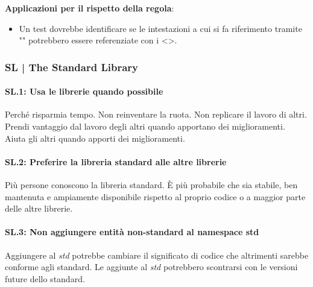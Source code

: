\textsf{\small \textbf{Applicazioni per il rispetto della regola}: }

\begin{itemize}
	\item \textsf{\small Un test dovrebbe identificare se le intestazioni a cui si fa riferimento tramite "" potrebbero essere referenziate con i <>.}
\end{itemize}



\newpage

\subsubsection{SL | The Standard Library}

\paragraph{SL.1: Usa le librerie quando possibile}

\textsf{\small Perché risparmia tempo. Non reinventare la ruota. Non replicare il lavoro di altri. Prendi vantaggio dal lavoro degli altri quando apportano dei miglioramenti. Aiuta gli altri quando apporti dei miglioramenti.} \\

\paragraph{SL.2: Preferire la libreria standard alle altre librerie}

\textsf{\small Più persone conoscono la libreria standard. È più probabile che sia stabile, ben mantenuta e ampiamente disponibile rispetto al proprio codice o a maggior parte delle altre librerie.} \\

\paragraph{SL.3: Non aggiungere entità non-standard al namespace std}

\textsf{\small Aggiungere al \emph{std} potrebbe cambiare il significato di codice che altrimenti sarebbe conforme agli standard. Le aggiunte al \emph{std} potrebbero scontrarsi con le versioni future dello standard.} \\

